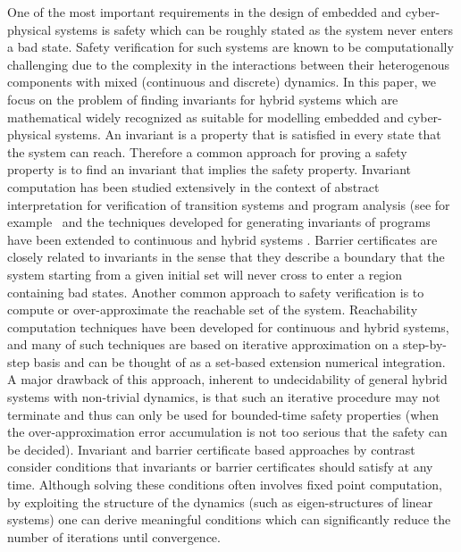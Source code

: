 One of the most important requirements in the design of embedded and cyber-physical systems is safety which can be roughly stated as the system never enters a bad state. Safety verification for such systems are known to be computationally challenging due to the complexity in the interactions between their heterogenous components with mixed (continuous and discrete) dynamics. In this paper, we focus on the problem of finding invariants for hybrid systems which are mathematical widely recognized as suitable for modelling embedded and cyber-physical systems. An invariant is a property that is satisfied in every state that the system can reach. 
Therefore a common approach for proving a safety property is to find an invariant that implies the safety property. Invariant computation has been studied extensively in the context of abstract interpretation for verification of transition systems and  program analysis (see for example~\cite{CousotHalbwachs78,DBLP:journals/fmsd/BensalemL99,DBLP:conf/tacas/TiwariRSS01,DBLP:conf/cav/ColonSS03,DBLP:conf/sas/Goubault13} and the techniques developed for generating invariants of programs have been extended to continuous and hybrid systems \cite{DBLP:conf/hybrid/SankaranarayananSM04,jeannet2009apron,DBLP:conf/hybrid/Rodriguez-CarbonellT05,DBLP:conf/cdc/SassiGS14,DBLP:journals/tecs/AllamigeonGSGP16,HybridFluctuat,DBLP:conf/vmcai/SogokonGJP16,DBLP:conf/aplas/DangG11}. Barrier certificates \cite{prajna2004safety} are closely related to invariants in the sense that they describe a boundary that the system starting from a given initial set will never cross to enter a region containing bad states. Another common approach to safety verification is to compute or over-approximate the reachable set of the system. Reachability computation techniques have been developed for continuous and hybrid systems, and many of such techniques are based on iterative approximation on a step-by-step basis and can be thought of as a set-based extension numerical integration. A major drawback of this approach, inherent to undecidability of general hybrid systems with non-trivial dynamics, is that such an iterative procedure may not terminate and thus can only be used for bounded-time safety properties (when the over-approximation error accumulation is not too serious that the safety can be decided). Invariant and barrier certificate based approaches by contrast consider conditions that invariants or barrier certificates should satisfy at any time. Although solving these conditions often involves fixed point computation, by exploiting the structure of the dynamics (such as eigen-structures of linear systems) one can derive meaningful conditions which can significantly reduce the number of iterations until convergence.

